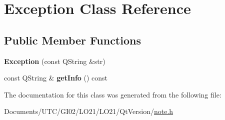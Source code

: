 \hypertarget{class_exception}{}\section{Exception Class Reference}
\label{class_exception}
\subsection*{Public Member Functions}
\begin{DoxyCompactItemize}
\item 
\mbox{\label{class_exception_a72d06f00500f1b551adadd188a1e1f33}} 
{\bfseries Exception} (const Q\+String \&str)
\item 
\mbox{\label{class_exception_a378568dd6f6421f43d323db53c2e5fe7}} 
const Q\+String \& {\bfseries get\+Info} () const
\end{DoxyCompactItemize}


The documentation for this class was generated from the following file\+:\begin{DoxyCompactItemize}
\item 
Documents/\+U\+T\+C/\+G\+I02/\+L\+O21/\+L\+O21/\+Qt\+Version/\hyperlink{note_8h}{note.\+h}\end{DoxyCompactItemize}

